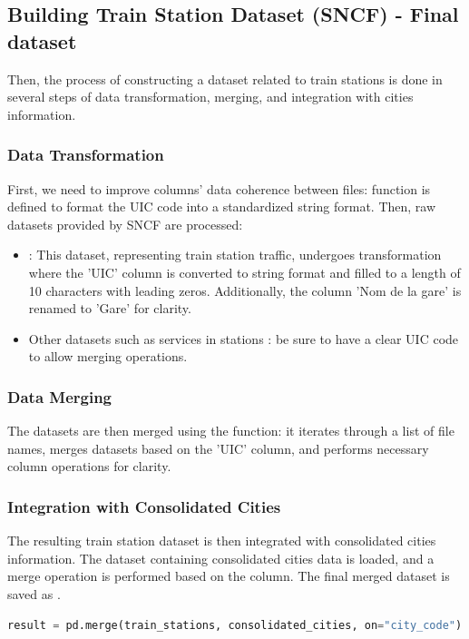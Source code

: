\subsection{Building Train Station Dataset (SNCF) - Final dataset}
Then, the process of constructing a dataset related to train stations is done in several steps of data transformation, merging, and integration with cities information.

\subsubsection{Data Transformation}
First, we need to improve columns' data coherence between files:  function is defined to format the UIC code into a standardized string format. Then, raw datasets provided by SNCF are processed:
\begin{itemize}
    \item {}: This dataset, representing train station traffic, undergoes transformation where the 'UIC' column is converted to string format and filled to a length of 10 characters with leading zeros. Additionally, the column 'Nom de la gare' is renamed to 'Gare' for clarity.
    \item Other datasets such as services in stations : be sure to have a clear UIC code to allow merging operations.
\end{itemize}

\subsubsection{Data Merging}
The datasets are then merged using the  function: it iterates through a list of file names, merges datasets based on the 'UIC' column, and performs necessary column operations for clarity.

\subsubsection{Integration with Consolidated Cities}
The resulting train station dataset is then integrated with consolidated cities information. The dataset containing consolidated cities data is loaded, and a merge operation is performed based on the  column. The final merged dataset is saved as .

\begin{lstlisting}[language=Python]
result = pd.merge(train_stations, consolidated_cities, on="city_code")
\end{lstlisting}

